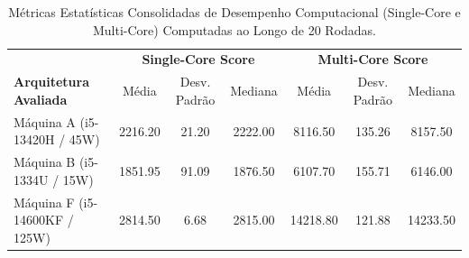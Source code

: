 \begin{table}[htbp]
\centering
\caption{Métricas Estatísticas Consolidadas de Desempenho Computacional (Single-Core e Multi-Core) Computadas ao Longo de 20 Rodadas.}
\label{tab:estatistica_benchmark}
\small
\begin{tabular}{lcccccc}
\hline
 & \multicolumn{3}{c}{\textbf{Single-Core Score}} & \multicolumn{3}{c}{\textbf{Multi-Core Score}} \\
\textbf{Arquitetura Avaliada} & Média & Desv. Padrão & Mediana & Média & Desv. Padrão & Mediana \\
\hline
Máquina A (i5-13420H / 45W) & 2216.20 & 21.20 & 2222.00 & 8116.50 & 135.26 & 8157.50 \\
Máquina B (i5-1334U / 15W) & 1851.95 & 91.09 & 1876.50 & 6107.70 & 155.71 & 6146.00 \\
Máquina F (i5-14600KF / 125W) & 2814.50 & 6.68 & 2815.00 & 14218.80 & 121.88 & 14233.50 \\
\hline
\end{tabular}
\end{table}